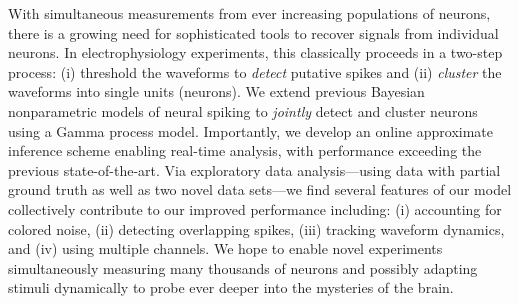
With simultaneous measurements from ever increasing populations of neurons, %
there is a growing need for sophisticated tools to recover signals from individual neurons.  In electrophysiology experiments, this classically proceeds in 
a two-step process: (i) threshold the waveforms to \emph{detect} putative spikes and (ii) \emph{cluster} the waveforms into single units (neurons).  
We extend previous Bayesian nonparametric models of neural spiking to \emph{jointly} detect and cluster neurons using a Gamma process model.  
Importantly, we develop an online approximate inference scheme enabling real-time analysis, with performance exceeding the previous state-of-the-art. 
Via exploratory data analysis---using data with partial ground truth as well as two novel data sets---we find several features of our model collectively contribute to our improved performance including: 
(i) accounting for colored noise, (ii) detecting overlapping spikes, (iii) tracking waveform dynamics, and (iv) using multiple channels.  
We hope to enable novel experiments simultaneously measuring many thousands of neurons and possibly adapting stimuli dynamically to probe ever deeper into the mysteries of the brain.
 
